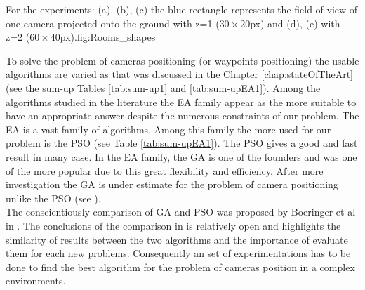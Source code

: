  \begin{mfigures}[!]{For the experiments: (a), (b), (c) the blue rectangle represents the field of view of one camera projected onto the ground  with z=1 ($30 \times 20 $px) and (d), (e) with z=2 ($60 \times 40 $px).}{fig:Rooms_shapes} \centering
{}
\hspace{1cm}
\hspace{1cm}
\end{mfigures}  
To solve the problem of cameras positioning (or waypoints positioning) the usable algorithms are varied as that was discussed in the Chapter \ref{chap:stateOfTheArt} (see the sum-up Tables \ref{tab:sum-up1} and \ref{tab:sum-upEA1}).
Among the algorithms studied in the literature the EA family appear as the more suitable to have an appropriate answer despite the numerous constraints of our problem. The EA is a vast family of algorithms. Among this family the more used for our problem is the PSO (see  Table \ref{tab:sum-upEA1}). The PSO gives a good and fast result in many case. In the EA family, the GA is one of the founders and was one of the more popular due to this great flexibility and efficiency.
 After more investigation the GA is under estimate for the problem of camera positioning unlike the PSO (see \citep{33*reddy2012,8*zhou2011,84*xu2011,143*maji2015,193*fu2014,194*fu2010}). \\
 The  conscientiously comparison  of GA and PSO was proposed by Boeringer et al in \citep{78*boeringer2004}. The conclusions  of the comparison in \citep{78*boeringer2004} is relatively open and highlights the similarity of results between the two algorithms and the importance of evaluate them for each new problems. Consequently an  set  of experimentations has to be done to find the best algorithm for the problem of cameras position in a complex environments. 




